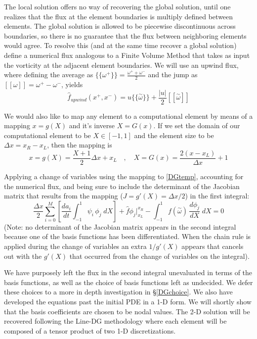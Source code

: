 \documentclass[letterpaper,12pt]{report}
\newcommand{\be}{\begin{equation}}
\newcommand{\ben}[1]{\begin{equation}\label{#1}}
\newcommand{\ee}{\end{equation}}
\newcommand{\aomega}{\overset{\sim}{\omega}}				%
\begin{document}
The local solution offers no way of recovering the global solution, until one realizes that the flux at the element boundaries is multiply defined between elements. The global solution is allowed to be piecewise discontinuous across boundaries, so there is no guarantee that the flux between neighboring elements would agree. To resolve this (and at the same time recover a global solution) define a numerical flux analogous to a Finite Volume Method that takes as input the vorticity at the adjacent element boundaries. We will use an upwind flux, where defining the average as $\{\!\{\omega^+\}\!\} = \frac{\omega^++\omega^-}{2}$ and the jump as $[[\omega]]=\omega^+-\omega^-$, yields
\be \hat{f}_{upwind}(x^+,x^-)=u\{\!\{\aomega\}\!\} + \frac{|u|}{2}[[\aomega]]\ee

We would also like to map any element to a computational element by means of a mapping $x=g(X)$ and it's inverse $X=G(x)$. If we set the domain of our computational element to be $X \in [-1, 1]$ and the element size to be $\Delta x = x_R - x_L$, then the mapping is
\be x=g(X)=\frac{X+1}{2}\Delta x + x_L\quad ,\quad X=G(x)=\frac{2(x-x_L)}{\Delta x}+1 \ee

Applying a change of variables using the mapping to \eqref{DGtemp}, accounting for the numerical flux, and being sure to include the determinant of the Jacobian matrix that results from the mapping ($J=g'(X)=\Delta x/2$) in the first integral:
\ben{DGtemp} \frac{\Delta x}{2}	\sum_{i=0}^M \left[ \frac{d a_i}{dt}	\int_{-1}^{1}\psi_i  \, \phi_j \;dX \right]
+\hat{f}\phi_j \Big|^{x_R}_{x_L} 
- \int_{-1}^{1} f(\aomega) \, \frac{d \phi_j}{dX} \;dX = 0 \ee
(Note: no determinant of the Jacobian matrix appears in the second integral because one of the basis functions has been differentiated. When the chain rule is applied during the change of variables an extra $1/g'(X)$ appears that cancels out with the $g'(X)$ that occurred from the change of variables on the integral).

We have purposely left the flux in the second integral unevaluated in terms of the basis functions, as well as the choice of basis functions left as undecided. We defer these choices to a more in depth investigation in \S \ref{DGchoice}. We also have developed the equations past the initial PDE in a 1-D form. We will shortly show that the basis coefficients are chosen to be nodal values. The 2-D solution will be recovered following the Line-DG methodology \cite{Persson2013} where each element will be composed of a tensor product of two 1-D discretizations.
\end{document}
